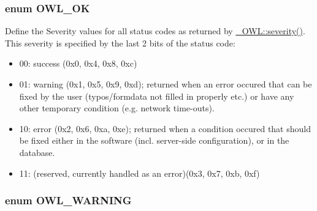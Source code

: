 \hypertarget{owl_8severitycodes_8php_bc72c053cfd10025fe57797c41eab18e}{
\subsubsection{\setlength{\rightskip}{0pt plus 5cm}enum {\bf OWL\_\-OK}}}
\label{owl_8severitycodes_8php_bc72c053cfd10025fe57797c41eab18e}


Define the Severity values for all status codes as returned by \hyperlink{class__OWL_5b88d497ccf2305fa411b9bd3f4bfe6f}{\_\-OWL::severity()}. This severity is specified by the last 2 bits of the status code:\begin{itemize}
\item 00: success (0x0, 0x4, 0x8, 0xc)\item 01: warning (0x1, 0x5, 0x9, 0xd); returned when an error occured that can be fixed by the user (typos/formdata not filled in properly etc.) or have any other temporary condition (e.g. network time-outs).\item 10: error (0x2, 0x6, 0xa, 0xe); returned when a condition occured that should be fixed either in the software (incl. server-side configuration), or in the database.\item 11: (reserved, currently handled as an error)(0x3, 0x7, 0xb, 0xf) \end{itemize}
\hypertarget{owl_8severitycodes_8php_ce886152e2e86cd2e91cb833fd495adb}{
\subsubsection{\setlength{\rightskip}{0pt plus 5cm}enum {\bf OWL\_\-WARNING}}}
\label{owl_8severitycodes_8php_ce886152e2e86cd2e91cb833fd495adb}


